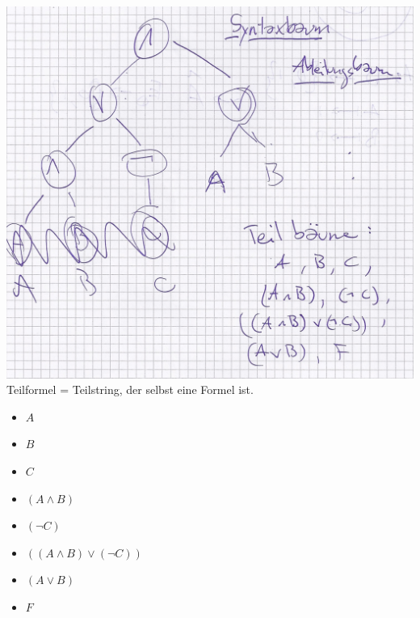\includegraphics[width=\textwidth]{Bild8} \\
Teilformel = Teilstring, der selbst eine Formel ist. \\
\begin{bsp*}
	\begin{itemize}
		\item $A$
		\item $B$
		\item $C$
		\item $( A \wedge B )$
		\item $( \neg C )$
		\item $( ( A \wedge B ) \vee ( \neg C ) )$
		\item $( A \vee B )$
		\item $F$
	\end{itemize}
\end{bsp*}
